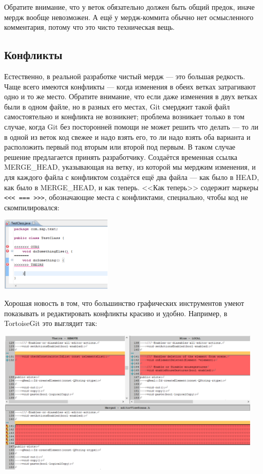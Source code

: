 \documentclass{../text-style}
\begin{document}
Обратите внимание, что у веток обязательно должен быть общий предок, иначе мердж вообще невозможен. А ещё у мердж-коммита обычно нет осмысленного комментария, потому что это чисто техническая вещь.

\subsection{Конфликты}

Естественно, в реальной разработке чистый мердж --- это большая редкость. Чаще всего имеются конфликты --- когда изменения в обеих ветках затрагивают одно и то же место. Обратите внимание, что если даже изменения в двух ветках были в одном файле, но в разных его местах, Git смерджит такой файл самостоятельно и конфликта не возникнет; проблема возникает только в том случае, когда Git без посторонней помощи не может решить что делать --- то ли в одной из веток код свежее и надо взять его, то ли надо взять оба варианта и расположить первый под вторым или второй под первым. В таком случае решение предлагается принять разработчику. Создаётся временная ссылка MERGE\_HEAD, указывающая на ветку, из которой мы мерджим изменения, и для каждого файла с конфликтом создаётся ещё два файла --- как было в HEAD, как было в MERGE\_HEAD, и как теперь. <<Как теперь>> содержит маркеры \verb|<<< === >>>|, обозначающие места с конфликтами, специально, чтобы код не скомпилировался:

\begin{center}
    \includegraphics[width=0.4\textwidth]{conflictsInCode.png}
\end{center}

Хорошая новость в том, что большинство графических инструментов умеют показывать и редактировать конфликты красиво и удобно. Например, в TortoiseGit это выглядит так:

\begin{center}
    \includegraphics[width=0.95\textwidth]{conflicts.png}
\end{center}
\end{document}
